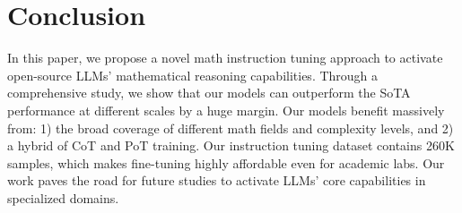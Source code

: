 \section{Conclusion}
In this paper, we propose a novel math instruction tuning approach to activate open-source LLMs' mathematical reasoning capabilities. Through a comprehensive study, we show that our models can outperform the SoTA performance at different scales by a huge margin. Our models benefit massively from: 1) the broad coverage of different math fields and complexity levels, and 2) a hybrid of CoT and PoT training. Our instruction tuning dataset contains 260K samples, which makes fine-tuning highly affordable even for academic labs. Our work paves the road for future studies to activate LLMs' core capabilities in specialized domains. 


